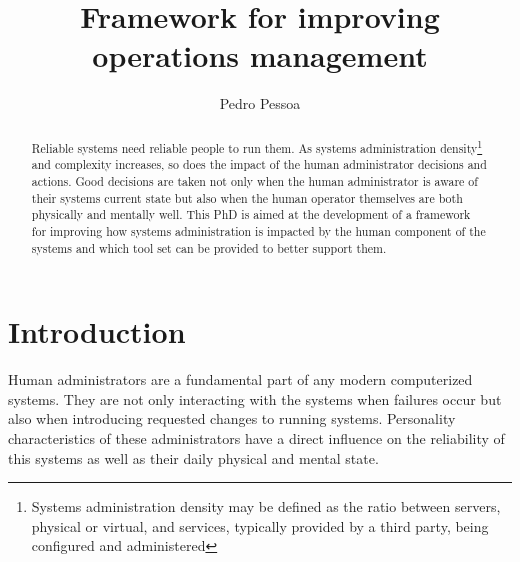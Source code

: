 \documentclass{llncs}
\begin{document}
%
\frontmatter          %
%
\pagestyle{headings}  %
%
\mainmatter              %
%
\title{Framework for improving operations management}
%
%
\author{Pedro Pessoa}
%
%
%

\maketitle              %

\begin{abstract}
Reliable systems need reliable people to run them. As systems administration density\footnote{Systems administration density may be defined as the ratio between servers, physical or virtual, and services, typically provided by a third party, being configured and administered} and complexity increases, so does the impact of the human administrator decisions and actions. Good decisions are taken not only when the human administrator is aware of their systems current state but also when the human operator themselves are both physically and mentally well. This PhD is aimed at the development of a framework for improving how systems administration is impacted by the human component of the systems and which tool set can be provided to better support them.
\end{abstract}
%
\section{Introduction}
%
Human administrators are a fundamental part of any modern computerized systems. They are not only interacting with the systems when failures occur but also when introducing requested changes to running systems. Personality characteristics of these administrators have a direct influence on the reliability of this systems as well as their daily physical and mental state.
\end{document}
